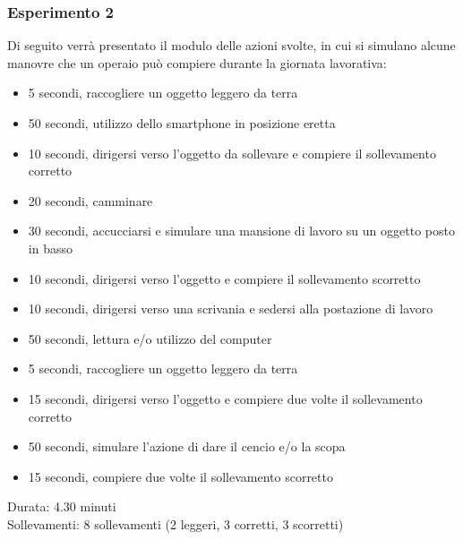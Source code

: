\documentclass[a4paper]{article}
\begin{document}
	\subsubsection{Esperimento 2}
Di seguito verrà presentato il modulo delle azioni svolte, in cui si simulano alcune manovre che un operaio può compiere durante la giornata lavorativa:
\begin{itemize}
\item 5 secondi, raccogliere un oggetto leggero da terra
\item 50 secondi,  utilizzo dello smartphone in posizione eretta 
\item 10 secondi, dirigersi verso l’oggetto da sollevare e compiere il sollevamento corretto
\item 20 secondi, camminare
\item 30 secondi, accucciarsi e simulare una mansione di lavoro su un oggetto posto in basso
\item 10 secondi, dirigersi verso l’oggetto e compiere il sollevamento scorretto
\item 10 secondi, dirigersi verso una scrivania e sedersi alla postazione di lavoro
\item 50 secondi, lettura e/o utilizzo del computer
\item 5 secondi, raccogliere un oggetto leggero da terra
\item 15 secondi, dirigersi verso l’oggetto e compiere due volte il sollevamento corretto
\item 50 secondi, simulare l’azione di dare il cencio e/o la scopa
\item 15 secondi, compiere due volte il sollevamento scorretto
\end{itemize}
Durata: 4.30 minuti \\
Sollevamenti: 8 sollevamenti (2 leggeri, 3 corretti, 3 scorretti)
\end{document}
